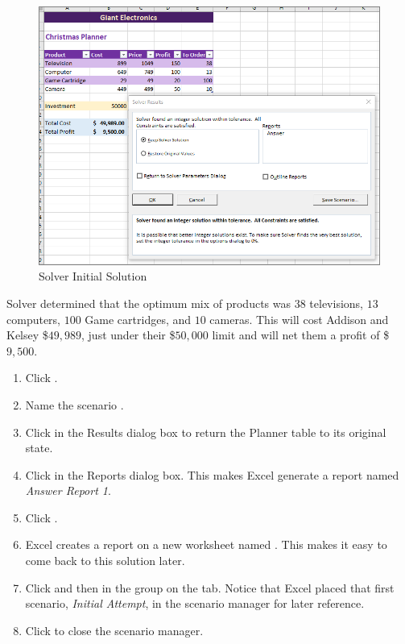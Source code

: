 \begin{figure}[H]
	\centering
	\includegraphics[width=\maxwidth{.95\linewidth}]{gfx/ch08_fig45}
	\caption{Solver Initial Solution}
	\label{08:fig45}
\end{figure}

Solver determined that the optimum mix of products was $ 38 $ televisions, $ 13 $ computers, $ 100 $ Game cartridges, and $ 10 $ cameras. This will cost Addison and Kelsey \$$ 49,989 $, just under their \$$ 50,000 $ limit and will net them a profit of \$$ 9,500 $. 

\begin{enumerate}[resume]
	\item Click .
	\item Name the scenario .
	\item Click  in the Results dialog box to return the Planner table to its original state.
	\item Click  in the Reports dialog box. This makes Excel generate a report named \textit{Answer Report 1}.
	\item Click .
	\item Excel creates a report on a new worksheet named . This makes it easy to come back to this solution later.
	\item Click  and then  in the  group on the  tab. Notice that Excel placed that first scenario, \textit{Initial Attempt}, in the scenario manager for later reference.
	\item Click  to close the scenario manager.
\end{enumerate}

